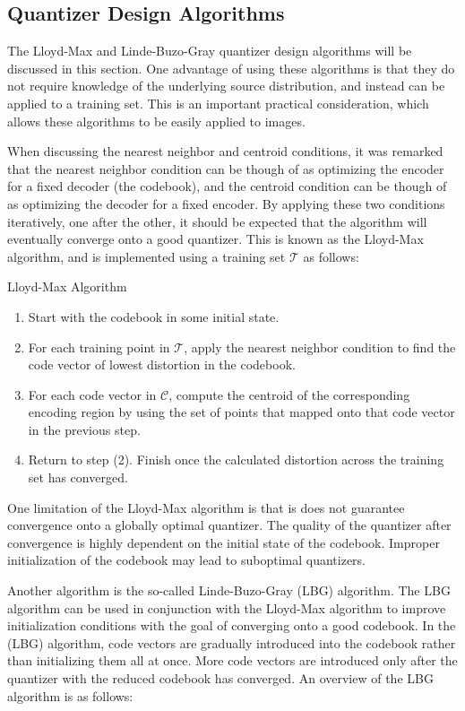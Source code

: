 \documentclass[10pt]{article}
\begin{document}
\subsection{Quantizer Design Algorithms}
\label{sec:quant_design_algos}
The Lloyd-Max and Linde-Buzo-Gray quantizer design algorithms will be discussed in this section. One advantage of using these algorithms is that they do not require knowledge of the underlying source distribution, and instead can be applied to a training set. This is an important practical consideration, which allows these algorithms to be easily applied to images.

When discussing the nearest neighbor and centroid conditions, it was remarked that the nearest neighbor condition can be though of as optimizing the encoder for a fixed decoder (the codebook), and the centroid condition can be though of as optimizing the decoder for a fixed encoder. By applying these two conditions iteratively, one after the other, it should be expected that the algorithm will eventually converge onto a good quantizer. This is known as the Lloyd-Max algorithm, and is implemented using a training set $\mathcal{T}$ as follows:

{\sc \noindent Lloyd-Max Algorithm}
\begin{enumerate}
\item Start with the codebook in some initial state.
\item For each training point in $\mathcal{T}$, apply the nearest neighbor condition to find the code vector of lowest distortion in the codebook.
\item For each code vector in $\mathcal{C}$, compute the centroid of the corresponding encoding region by using the set of points that mapped onto that code vector in the previous step.
\item Return to step (2). Finish once the calculated distortion across the training set has converged.
\end{enumerate}
One limitation of the Lloyd-Max algorithm is that is does not guarantee convergence onto a globally optimal quantizer. The quality of the quantizer after convergence is highly dependent on the initial state of the codebook. Improper initialization of the codebook may lead to suboptimal quantizers.

Another algorithm is the so-called Linde-Buzo-Gray (LBG) algorithm. The LBG algorithm can be used in conjunction with the Lloyd-Max algorithm to improve initialization conditions with the goal of converging onto a good codebook. In the (LBG) algorithm, code vectors are gradually introduced into the codebook rather than initializing them all at once. More code vectors are introduced only after the quantizer with the reduced codebook has converged. An overview of the LBG algorithm is as follows:
\end{document}
